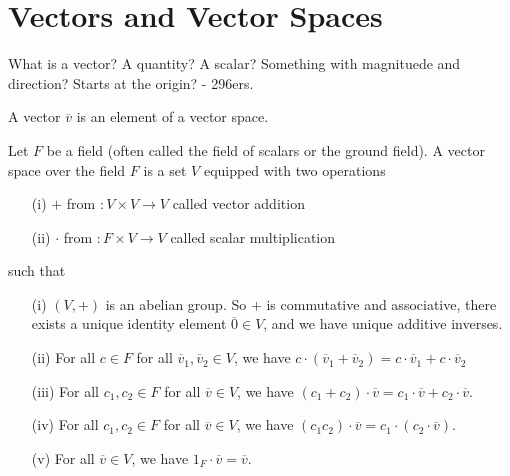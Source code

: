 \section{Vectors and Vector Spaces}
What is a vector? A quantity? A scalar? Something with magnituede and direction? Starts at the origin? - 296ers.
\begin{definition}[Vector]
    A vector \(\overline{v} \) is an element of a vector space. 
\end{definition}
\begin{definition}
    Let \(F\) be a field (often called the field of scalars or the ground field). A vector space over the field \(F\) is a set \(V\) equipped with two operations
    \begin{itemize}
        \item[(i)] \(+\) from \(\colon V\times V\to V\) called vector addition 
        \item[(ii)] \(\cdot \) from \(\colon F\times V \to V\) called scalar multiplication 
    \end{itemize}
    such that
    \begin{itemize}
        \item[(i)] \((V,+)\) is an abelian group. So \(+\) is commutative and associative, there exists a unique identity element \(\overline{0} \in V \), and we have unique additive inverses.   
        \item[(ii)] For all \(c \in F\) for all \(\overline{v} _1 , \overline{v} _2 \in V\), we have \(c \cdot (\overline{v} _1 +\overline{v} _2) = c \cdot \overline{v} _1 + c \cdot \overline{v} _2\)   
        \item[(iii)] For all \(c_1, c_2 \in F\) for all \(\overline{v} \in V\), we have \((c_1 + c_2)\cdot \overline{v} = c_1 \cdot \overline{v} +c_2 \cdot \overline{v} \).   
        \item[(iv)] For all \(c_1, c_2 \in F\) for all \(\overline{v} \in V\), we have \((c_1 c_2)\cdot \overline{v} = c_1 \cdot  (c_2 \cdot \overline{v} )\). 
        \item[(v)] For all \(\overline{v} \in V\), we have \(1_F \cdot \overline{v} = \overline{v} \).
    \end{itemize}
\end{definition}
